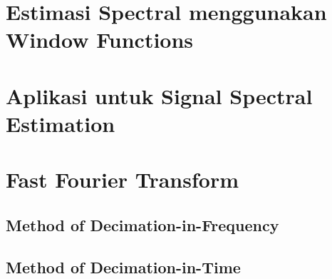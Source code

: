 \documentclass[pdflatex,compress,mathserif]{beamer}
\begin{document}
\section{Estimasi Spectral menggunakan Window Functions}

\section{Aplikasi untuk Signal Spectral Estimation}

\section{Fast Fourier Transform}

\subsection{Method of Decimation-in-Frequency}

\subsection{Method of Decimation-in-Time}
\end{document}
